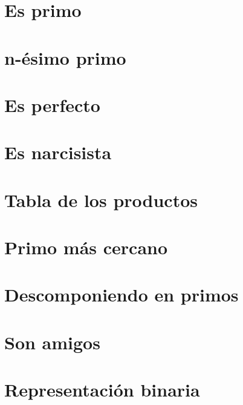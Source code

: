 \section{Es primo}


\section{n-ésimo primo}


\section{Es perfecto}


\section{Es narcisista}


\section{Tabla de los productos}


\section{Primo más cercano}


\section{Descomponiendo en primos}


\section{Son amigos}


\section{Representación binaria}

